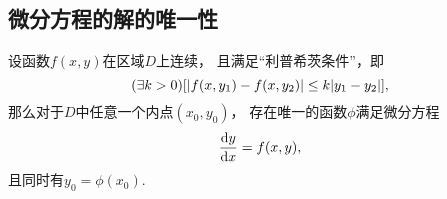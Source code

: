 \subsection{微分方程的解的唯一性}
\begin{theorem}
设函数\(f(x,y)\)在区域\(D\)上连续，
且满足“利普希茨条件”，即\begin{equation*}
	(\exists k>0)
	[
		\abs{f(x,y_1) - f(x,y_2)}
		\leq
		k \abs{y_1 - y_2}
	],
\end{equation*}
那么对于\(D\)中任意一个内点\((x_0,y_0)\)，
存在唯一的函数\(\phi\)满足微分方程\begin{equation*}
	\dv{y}{x} = f(x,y),
\end{equation*}
且同时有\(y_0 = \phi(x_0)\).
\end{theorem}
